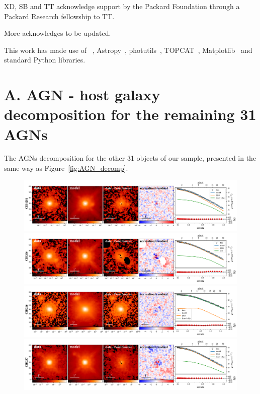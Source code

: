 \documentclass[apj]{emulateapj}
\begin{document}
XD, SB and TT acknowledge support by the Packard Foundation through a Packard Research fellowship to TT.

{\color{red} More acknowledges to be updated.}

This work has made use of \lenstronomy~\citep{lenstronomy}, {\sc Astropy}~\citep{Astropy}, {\sc photutils}~\citep{photutils}, {\sc TOPCAT}~\citep{TOPCAT}, {\sc Matplotlib}~\citep{Matplotlib} %
and standard Python libraries.




\newpage

\appendix

\section{A. AGN - host galaxy decomposition for the remaining 31 AGNs}\label{sec:restsample}
The AGNs decomposition for the other 31 objects of our sample, presented in the same way as Figure~\ref{fig:AGN_decomp}.

\begin{figure}[ht]
\centering
{
\includegraphics[height=0.25\textwidth]{fig/best_fit_CID1281_SB_profile.pdf}
\includegraphics[height=0.25\textwidth]{fig/best_fit_CID206_SB_profile.pdf}
\includegraphics[height=0.25\textwidth]{fig/best_fit_CID216_SB_profile.pdf}
\includegraphics[height=0.25\textwidth]{fig/best_fit_CID237_SB_profile.pdf}
}
\end{figure} 
\end{document}
